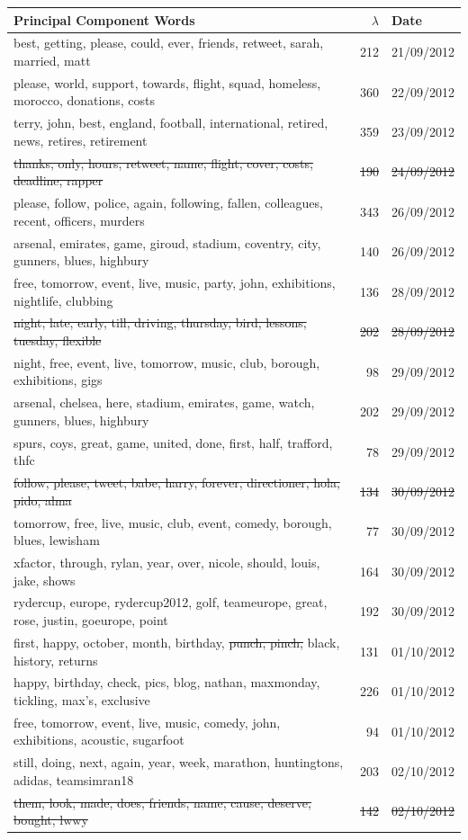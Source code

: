 \documentclass[11pt,a4paper]{article}
\begin{document}
\begin{table}[H]

\begin{tabular}{| p{11cm}| r | l|}
\hline
Principal Component Words & $\lambda$ & Date\\
\hline
best, getting, please, could, ever, friends, retweet, sarah, married, matt & 212 & 21/09/2012	 \\
please, world, support, towards, flight, squad, homeless, morocco, donations, costs & 360 & 22/09/2012\\
terry, john, best, england, football, international, retired, news, retires, retirement & 359 &  23/09/2012\\
\st{thanks, only, hours, retweet, name, flight, cover, costs, deadline, rapper} & \st{190} & \st{24/09/2012}\\
please, follow, police, again, following, fallen, colleagues, recent, officers, murders & 343 & 26/09/2012\\
arsenal, emirates, game, giroud, stadium, coventry, city, gunners, blues, highbury & 140 & 26/09/2012\\
free, tomorrow, event, live, music, party, john, exhibitions, nightlife, clubbing & 136 & 28/09/2012\\
\st{night, late, early, till, driving, thursday, bird, lessons, tuesday, flexible}
& \st{202} & \st{28/09/2012}\\
night, free, event, live, tomorrow, music, club, borough, exhibitions, gigs & 98 & 29/09/2012\\
arsenal, chelsea, here, stadium, emirates, game, watch, gunners, blues, highbury & 202 & 29/09/2012\\
spurs, coys, great, game, united, done, first, half, trafford, thfc & 78 & 29/09/2012\\
\st{follow, please, tweet, babe, harry, forever, directioner, hola, pido, alma} & \st{134} & \st{30/09/2012}\\
tomorrow, free, live, music, club, event, comedy, borough, blues, lewisham & 77 & 30/09/2012\\
xfactor, through, rylan, year, over, nicole, should, louis, jake, shows & 164 & 30/09/2012\\
rydercup, europe, rydercup2012, golf, teameurope, great, rose, justin, goeurope, point & 192 & 30/09/2012\\
first, happy, october, month, birthday, \st{punch, pinch,} black, history, returns & 131 & 01/10/2012\\
happy, birthday, check, pics, blog, nathan, maxmonday, tickling, max's, exclusive & 226 & 01/10/2012\\
free, tomorrow, event, live, music, comedy, john, exhibitions, acoustic, sugarfoot & 94 & 01/10/2012\\
still, doing, next, again, year, week, marathon, huntingtons, adidas, teamsimran18 & 203 & 02/10/2012\\
\st{them, look, made, does, friends, name, cause, deserve, bought, lwwy} & \st{142} & \st{02/10/2012}\\


\end{tabular}
\end{table}
\end{document}
